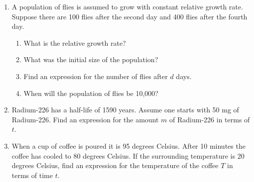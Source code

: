 \documentclass[11pt,fleqn]{article}
\begin{document}
\setlength{\parindent}{0cm}
\renewcommand{\headrulewidth}{0pt}
\newcommand{\blank}[1]{\rule{#1}{0.75pt}}
\renewcommand{\d}{\displaystyle}
\vspace*{-0.7in}
\begin{center}
 {\large{ }}
\end{center}
\begin{enumerate} 	
\item A population of flies is assumed to grow with constant relative growth rate.  Suppose there are 100 flies after the
second day and 400 flies after the fourth day. 
	\begin{enumerate}
	\item What is the relative growth rate?\\
	\vfill
	\item What was the initial size of the population?\\
	\vfill
	\item Find an expression for the number of flies after $d$ days.
	\vfill
	\item When will the population of flies be 10,000?
	\vfill
	\end{enumerate}
\newpage
\item Radium-226 has a half-life of 1590 years. Assume one starts with 50 mg of Radium-226. Find an expression for the amount $m$ of Radium-226 in terms of $t$.
\vfill
\item When a  cup of coffee is poured it is 95 degrees Celsius. After 10 minutes the coffee has cooled to 80 degrees Celsius. If the surrounding temperature is 20 degrees Celsius, find an expression for the temperature of the coffee $T$ in terms of time $t.$
\vfill
\end{enumerate}
\end{document}

